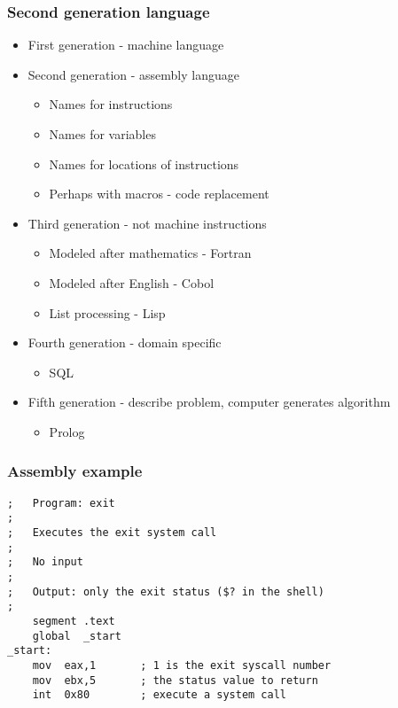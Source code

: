 \documentclass{beamer}
\begin{document}
\begin{frame}
    \frametitle{Second generation language}
    \begin{itemize}
        \item First generation - machine language
        \item Second generation - assembly language
        \begin{itemize}
            \item Names for instructions
            \item Names for variables
            \item Names for locations of instructions
            \item Perhaps with macros - code replacement
        \end{itemize}
        \item Third generation - not machine instructions
        \begin{itemize}
            \item Modeled after mathematics - Fortran
            \item Modeled after English - Cobol
            \item List processing - Lisp
        \end{itemize}
        \item Fourth generation - domain specific
        \begin{itemize}
            \item SQL
        \end{itemize}
        \item Fifth generation - describe problem, computer generates algorithm
        \begin{itemize}
            \item Prolog
        \end{itemize}
    \end{itemize}
\end{frame}

\begin{frame}[fragile]
\frametitle{Assembly example}

\begin{verbatim}
;   Program: exit
;
;   Executes the exit system call
;
;   No input
;
;   Output: only the exit status ($? in the shell)
;
    segment .text
    global  _start
_start:
    mov  eax,1       ; 1 is the exit syscall number
    mov  ebx,5       ; the status value to return
    int  0x80        ; execute a system call
\end{verbatim}
\end{frame}
\end{document}
